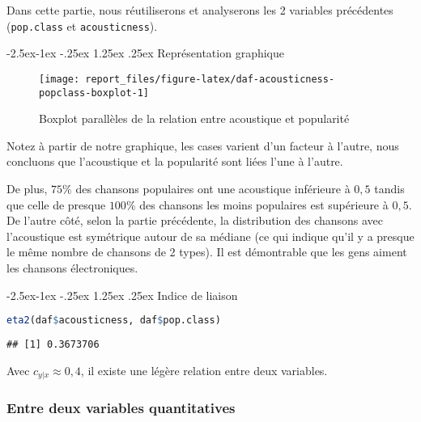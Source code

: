\documentclass[
  11pt,
  xcolor = usenames,dvipsnames]{article}
\makeatletter
\newcommand{\passthrough}[1]{#1}
\renewcommand\paragraph{\@startsection{paragraph}{4}{\z@}%
        {-2.5ex\@plus -1ex \@minus -.25ex}%
        {1.25ex \@plus .25ex}%
        {\normalfont\normalsize\bfseries}}
\makeatother
\begin{document}
Dans cette partie, nous réutiliserons et analyserons les 2 variables précédentes (\passthrough{\lstinline!pop.class!} et \passthrough{\lstinline!acousticness!}).

\hypertarget{repruxe9sentation-graphique}{%
\paragraph{Représentation graphique}\label{repruxe9sentation-graphique}}

\begin{figure}

{\centering \texttt{[image: report\_files/figure-latex/daf-acousticness-popclass-boxplot-1]} 

}

\caption{Boxplot parallèles de la relation entre acoustique et popularité}\label{fig:daf-acousticness-popclass-boxplot}
\end{figure}

Notez à partir de notre graphique, les cases varient d'un facteur à l'autre,
nous concluons que l'acoustique et la popularité sont liées l'une à l'autre.

De plus, \(75\%\) des chansons populaires ont une acoustique inférieure à \(0,5\) tandis que celle de presque \(100\%\) des chansons les moins populaires est supérieure à \(0,5\).
De l'autre côté, selon la partie précédente, la distribution des chansons avec l'acoustique est symétrique autour de sa médiane (ce qui indique qu'il y a presque le même nombre de chansons de 2 types).
Il est démontrable que les gens aiment les chansons électroniques.

\hypertarget{indice-de-liaison}{%
\paragraph{Indice de liaison}\label{indice-de-liaison}}

\begin{lstlisting}[language=R]
eta2(daf$acousticness, daf$pop.class)
\end{lstlisting}

\begin{lstlisting}
## [1] 0.3673706
\end{lstlisting}

Avec \(c_{y|x} \approx 0,4\), il existe une légère relation entre deux variables.

\hypertarget{volume-energy}{%
\subsubsection{Entre deux variables quantitatives}\label{volume-energy}}
\end{document}
